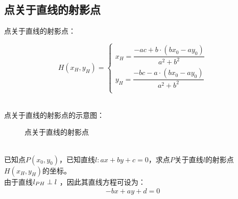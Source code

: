 \documentclass[UTF8]{ctexart}
\begin{document}
\subsection{点关于直线的射影点}
    点关于直线的射影点：
    \begin{large}
        \begin{equation*}
            H(x_H,y_H)=
            \begin{cases}
                x_H=\dfrac{-ac+b\cdot(bx_0-ay_0)}{a^2+b^2}\\[8mm]
                y_H=\dfrac{-bc-a\cdot(bx_0-ay_0)}{a^2+b^2}\\
            \end{cases}
        \end{equation*}
    \end{large}\\[3mm]
    点关于直线的射影点的示意图：
    \begin{figure}[h]
        \begin{center}
            \caption{点关于直线的射影点}
        \end{center}
    \end{figure}\\
    已知点$P(x_0,y_0)$，已知直线$l:ax+by+c=0$，求点$P$关于直线$l$的射影点$H(x_H,y_H)$的坐标。\\[3mm]
    由于直线$l_{PH}\perp l\hspace{3.5pt}$，因此其直线方程可设为：
    \begin{align}
        -bx+ay+d=0
    \end{align}\\
\end{document}
